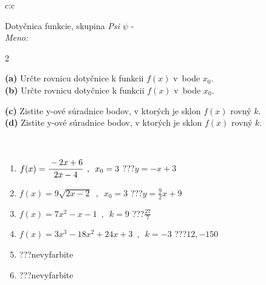\documentclass[10pt]{report}
\begin{document}
\begin{tabular}{c:c}
\begin{minipage}[c][104.5mm][t]{0.5\linewidth}
\begin{center}
\vspace{7mm}
{\huge Dotyčnica funkcie, skupina \textit{Psi $\psi$} -}\\[5mm]
\textit{Meno:}\phantom{xxxxxxxxxxxxxxxxxxxxxxxxxxxxxxxxxxxxxxxxxxxxxxxxxxxxxxxxxxxxxxxxx}\\[5mm]
\begin{minipage}{0.95\linewidth}
\begin{center}
{\small \begin{multicols}{2} \raggedright
\textbf{(a)} Určte rovnicu dotyčnice k funkcii \(f(x)\) v~bode \(x_0\). \\[1mm]
\textbf{(b)} Určte rovnicu dotyčnice k funkcii \(f(x)\) v~bode \(x_0\). \par \columnbreak
\textbf{(c)} Zistite y-ové súradnice bodov, v ktorých je sklon \(f(x)\) rovný \(k\). \\[1mm]
\textbf{(d)} Zistite y-ové súradnice bodov, v ktorých je sklon \(f(x)\) rovný \(k\). \\[1mm]
\end{multicols}
}
\end{center}
\end{minipage}
\\[4mm]
\begin{minipage}{0.79\linewidth}
\begin{center}
\begin{varwidth}{\linewidth}
\begin{enumerate}
\normalsizerr
\item $f(x)=\cfrac{-2x+6}{2x-4}\enspace , \enspace x_0=3$\quad \dotfill\; ???\;\dotfill \quad $y = -x+3$
\item $f(x)=9\sqrt{2x-2}\enspace , \enspace x_0=3$\quad \dotfill\; ???\;\dotfill \quad $y = \frac{9}{2}x+9$
\item $f(x)=7x^2-x-1\enspace , \enspace k=9$\quad \dotfill\; ???\;\dotfill \quad $\frac{27}{7}$
\item $f(x)=3x^3-18x^2+24x+3\enspace , \enspace k=-3$\quad \dotfill\; ???\;\dotfill \quad $12 , -150$
\item \quad \dotfill\; ???\;\dotfill \quad nevyfarbite
\item \quad \dotfill\; ???\;\dotfill \quad nevyfarbite
\end{enumerate}
\end{varwidth}
\end{center}

\end{minipage}
\end{center}
\end{minipage}
\end{tabular}
\end{document}
